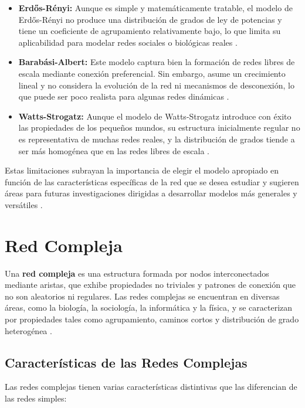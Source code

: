 \begin{itemize}
    \item \textbf{Erdős-Rényi:} Aunque es simple y matemáticamente tratable, el modelo de Erdős-Rényi no produce una distribución de grados de ley de potencias y tiene un coeficiente de agrupamiento relativamente bajo, lo que limita su aplicabilidad para modelar redes sociales o biológicas reales .
    \item \textbf{Barabási-Albert:} Este modelo captura bien la formación de redes libres de escala mediante conexión preferencial. Sin embargo, asume un crecimiento lineal y no considera la evolución de la red ni mecanismos de desconexión, lo que puede ser poco realista para algunas redes dinámicas .
    \item \textbf{Watts-Strogatz:} Aunque el modelo de Watts-Strogatz introduce con éxito las propiedades de los pequeños mundos, su estructura inicialmente regular no es representativa de muchas redes reales, y la distribución de grados tiende a ser más homogénea que en las redes libres de escala .
\end{itemize}

Estas limitaciones subrayan la importancia de elegir el modelo apropiado en función de las características específicas de la red que se desea estudiar y sugieren áreas para futuras investigaciones dirigidas a desarrollar modelos más generales y versátiles .

\section{Red Compleja}

Una \textbf{red compleja} es una estructura formada por nodos interconectados mediante aristas, que exhibe propiedades no triviales y patrones de conexión que no son aleatorios ni regulares. Las redes complejas se encuentran en diversas áreas, como la biología, la sociología, la informática y la física, y se caracterizan por propiedades tales como agrupamiento, caminos cortos y distribución de grado heterogénea \citep{Newman2010}.

\subsection{Características de las Redes Complejas}

Las redes complejas tienen varias características distintivas que las diferencian de las redes simples:

